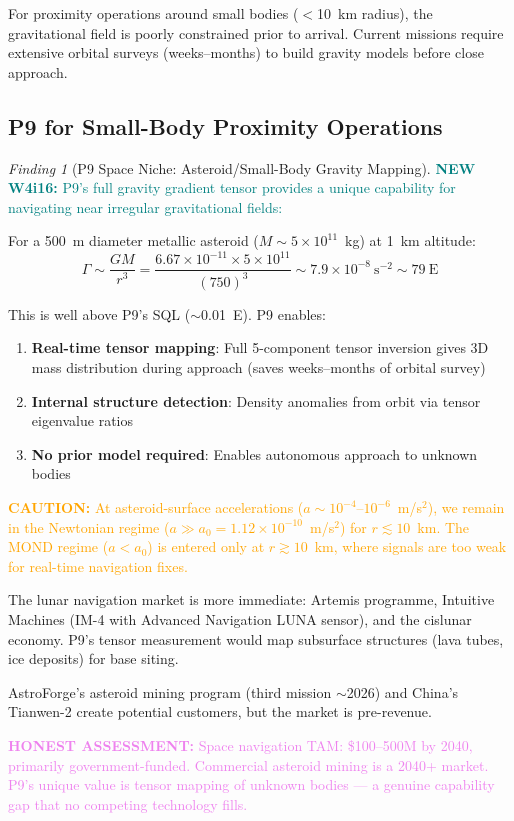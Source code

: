 \documentclass[11pt]{article}
\theoremstyle{definition}
\theoremstyle{remark}
\newtheorem{finding}[theorem]{Finding}
\newcommand{\ee}[1]{\times10^{#1}}
\newcommand{\caution}[1]{\textcolor{orange}{\textbf{CAUTION:} #1}}
\newcommand{\honest}[1]{\textcolor{violet}{\textbf{HONEST ASSESSMENT:} #1}}
\newcommand{\newfinding}[1]{\textcolor{teal}{\textbf{NEW W4i16:} #1}}
\begin{document}
For proximity operations around small bodies ($<$10~km radius),
the gravitational field is poorly constrained prior to arrival.
Current missions require extensive orbital surveys (weeks--months)
to build gravity models before close approach.

\subsection{P9 for Small-Body Proximity Operations}

\begin{finding}[P9 Space Niche: Asteroid/Small-Body Gravity Mapping]
\label{find:space-nav}
\newfinding{P9's full gravity gradient tensor provides a unique
capability for navigating near irregular gravitational fields:}

For a 500~m diameter metallic asteroid ($M \sim 5\ee{11}$~kg)
at 1~km altitude:
\begin{equation}
\Gamma \sim \frac{GM}{r^3}
= \frac{6.67\ee{-11} \times 5\ee{11}}{(750)^3}
\sim 7.9\ee{-8}~\mathrm{s^{-2}}
\sim 79~\mathrm{E}
\end{equation}

This is well above P9's SQL ($\sim$0.01~E). P9 enables:
\begin{enumerate}[nosep]
  \item \textbf{Real-time tensor mapping}: Full 5-component
    tensor inversion gives 3D mass distribution during approach
    (saves weeks--months of orbital survey)
  \item \textbf{Internal structure detection}: Density anomalies
    from orbit via tensor eigenvalue ratios
  \item \textbf{No prior model required}: Enables autonomous approach
    to unknown bodies
\end{enumerate}

\caution{At asteroid-surface accelerations
($a \sim 10^{-4}$--$10^{-6}$~m/s$^2$), we remain in the
Newtonian regime ($a \gg a_0 = 1.12\ee{-10}$~m/s$^2$) for
$r \lesssim 10$~km. The MOND regime ($a < a_0$) is entered only
at $r \gtrsim 10$~km, where signals are too weak for real-time
navigation fixes.}

The lunar navigation market is more immediate: Artemis programme,
Intuitive Machines (IM-4 with Advanced Navigation LUNA sensor),
and the cislunar economy. P9's tensor measurement would map
subsurface structures (lava tubes, ice deposits) for base siting.

AstroForge's asteroid mining program (third mission $\sim$2026)
and China's Tianwen-2 create potential customers, but the market
is pre-revenue.

\honest{Space navigation TAM: \$100--500M by 2040, primarily
government-funded. Commercial asteroid mining is a 2040+ market.
P9's unique value is tensor mapping of unknown bodies --- a genuine
capability gap that no competing technology fills.}
\end{finding}
\end{document}
